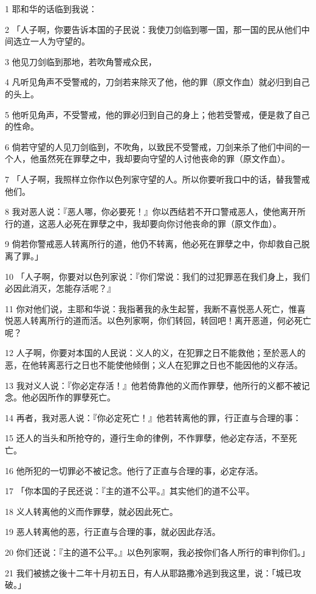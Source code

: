 \par 1 耶和华的话临到我说：
\par 2 「人子啊，你要告诉本国的子民说：我使刀剑临到哪一国，那一国的民从他们中间选立一人为守望的。
\par 3 他见刀剑临到那地，若吹角警戒众民，
\par 4 凡听见角声不受警戒的，刀剑若来除灭了他，他的罪（原文作血）就必归到自己的头上。
\par 5 他听见角声，不受警戒，他的罪必归到自己的身上；他若受警戒，便是救了自己的性命。
\par 6 倘若守望的人见刀剑临到，不吹角，以致民不受警戒，刀剑来杀了他们中间的一个人，他虽然死在罪孽之中，我却要向守望的人讨他丧命的罪（原文作血）。
\par 7 「人子啊，我照样立你作以色列家守望的人。所以你要听我口中的话，替我警戒他们。
\par 8 我对恶人说：『恶人哪，你必要死！』你以西结若不开口警戒恶人，使他离开所行的道，这恶人必死在罪孽之中，我却要向你讨他丧命的罪（原文作血）。
\par 9 倘若你警戒恶人转离所行的道，他仍不转离，他必死在罪孽之中，你却救自己脱离了罪。」
\par 10 「人子啊，你要对以色列家说：『你们常说：我们的过犯罪恶在我们身上，我们必因此消灭，怎能存活呢？』
\par 11 你对他们说，主耶和华说：我指著我的永生起誓，我断不喜悦恶人死亡，惟喜悦恶人转离所行的道而活。以色列家啊，你们转回，转回吧！离开恶道，何必死亡呢？
\par 12 人子啊，你要对本国的人民说：义人的义，在犯罪之日不能救他；至於恶人的恶，在他转离恶行之日也不能使他倾倒；义人在犯罪之日也不能因他的义存活。
\par 13 我对义人说：『你必定存活！』他若倚靠他的义而作罪孽，他所行的义都不被记念。他必因所作的罪孽死亡。
\par 14 再者，我对恶人说：『你必定死亡！』他若转离他的罪，行正直与合理的事：
\par 15 还人的当头和所抢夺的，遵行生命的律例，不作罪孽，他必定存活，不至死亡。
\par 16 他所犯的一切罪必不被记念。他行了正直与合理的事，必定存活。
\par 17 「你本国的子民还说：『主的道不公平。』其实他们的道不公平。
\par 18 义人转离他的义而作罪孽，就必因此死亡。
\par 19 恶人转离他的恶，行正直与合理的事，就必因此存活。
\par 20 你们还说：『主的道不公平。』以色列家啊，我必按你们各人所行的审判你们。」
\par 21 我们被掳之後十二年十月初五日，有人从耶路撒冷逃到我这里，说：「城已攻破。」
